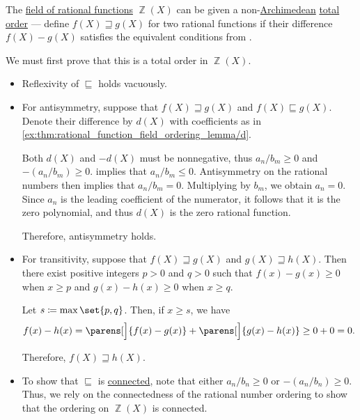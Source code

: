 \begin{example}\label{ex:rational_function_field_non_archimedean}
  The \hyperref[def:rational_function_field]{field of rational functions} \( \BbbZ(X) \) can be given a non-\hyperref[def:archimedean_semiring]{Archimedean} \hyperref[def:totally_ordered_set]{total order} --- define \( f(X) \sqsupseteq g(X) \) for two rational functions if their difference \( f(X) - g(X) \) satisfies the equivalent conditions from .

  We must first prove that this is a total order in \( \BbbZ(X) \).
  \begin{itemize}
    \item Reflexivity of \( {\sqsubseteq} \) holds vacuously.

    \item For antisymmetry, suppose that \( f(X) \sqsupseteq g(X) \) and \( f(X) \sqsubseteq g(X) \). Denote their difference by \( d(X) \) with coefficients as in \eqref{ex:thm:rational_function_field_ordering_lemma/d}.

    Both \( d(X) \) and \( -d(X) \) must be nonnegative, thus \( a_n / b_m \geq 0 \) and \( -(a_n / b_m) \geq 0 \).  implies that \( a_n / b_m \leq 0 \). Antisymmetry on the rational numbers then implies that \( a_n / b_m = 0 \). Multiplying by \( b_m \), we obtain \( a_n = 0 \). Since \( a_n \) is the leading coefficient of the numerator, it follows that it is the zero polynomial, and thus \( d(X) \) is the zero rational function.

    Therefore, antisymmetry holds.

    \item For transitivity, suppose that \( f(X) \sqsupseteq g(X) \) and \( g(X) \sqsupseteq h(X) \). Then there exist positive integers \( p > 0 \) and \( q > 0 \) such that \( f(x) - g(x) \geq 0 \) when \( x \geq p \) and \( g(x) - h(x) \geq 0 \) when \( x \geq q \).

    Let \( s \coloneqq \max\set{ p, q } \). Then, if \( x \geq s \), we have
    \begin{equation*}
      f(x) - h(x) = \parens[\Big]{ f(x) - g(x) } + \parens[\Big]{ g(x) - h(x) } \geq 0 + 0 = 0.
    \end{equation*}

    Therefore, \( f(X) \sqsupseteq h(X) \).

    \item To show that \( {\sqsubseteq} \) is \hyperref[def:binary_relation/connected]{connected}, note that either \( a_n / b_n \geq 0 \) or \( -(a_n / b_n) \geq 0 \). Thus, we rely on the connectedness of the rational number ordering to show that the ordering on \( \BbbZ(X) \) is connected.
  \end{itemize}


\end{example}
